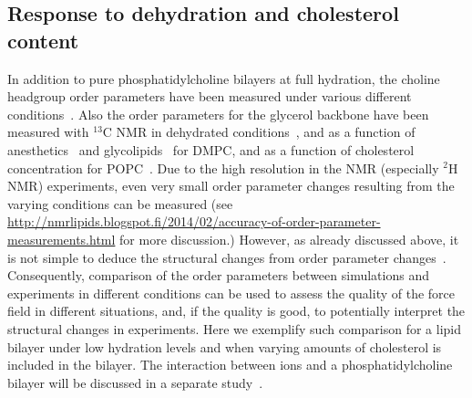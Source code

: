 \documentclass[journal=jacsat,manuscript=article]{achemso}
\begin{document}
\subsection{Response to dehydration and cholesterol content}
In addition to pure phosphatidylcholine bilayers at full hydration, the choline headgroup order parameters
have been measured under various different conditions~\cite{gally75,brown77,brown78,akutsu81,altenbach84,scherer89,bechinger91,ulrich94,dvinskikh05b,castro08,kapla12,ferreira13}.
Also the order parameters for the glycerol backbone have been measured with $^{13}$C NMR in dehydrated conditions~\cite{dvinskikh05b}, and as a function 
of anesthetics~\cite{castro08} and glycolipids~\cite{kapla12} for DMPC, and as a function of cholesterol 
concentration for POPC~\cite{ferreira13}. Due to the high resolution in the NMR (especially $^2$H NMR) experiments,
even very small order parameter changes resulting from the varying conditions can be measured (see
\url{http://nmrlipids.blogspot.fi/2014/02/accuracy-of-order-parameter-measurements.html}
for more discussion.)
However, as already discussed above, it is not simple to deduce 
the structural changes from order parameter changes~\cite{akutsu91,semchyschyn04}. Consequently, comparison of the order parameters
between simulations and experiments in different conditions can be used to assess the quality of the force field 
in different situations, and, if the quality is good, to potentially interpret the structural changes in experiments.
Here we exemplify such comparison for a lipid bilayer under low hydration levels and when varying amounts of cholesterol is included in the bilayer. 
The interaction between ions and a phosphatidylcholine bilayer will be discussed in a separate study~\cite{ionpaper}.
\end{document}

